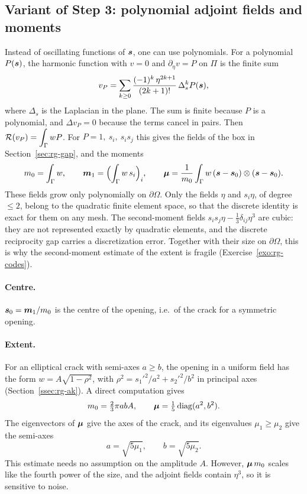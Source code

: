 \subsection{Variant of Step 3: polynomial adjoint fields and moments}\label{ssec:rg-poly}
%
Instead of oscillating functions of $\bm{s}$, one can use polynomials. For a polynomial $P(\bm{s})$, the harmonic function with $v=0$ and $\partial_\eta v=P$ on $\Pi$ is the finite sum
\begin{equation}\label{eq:rg-ck}
v_P=\sum_{k\ge0}\frac{(-1)^k\,\eta^{2k+1}}{(2k+1)!}\,\Delta_s^kP(\bm{s}),
\end{equation}
where $\Delta_s$ is the Laplacian in the plane. The sum is finite because $P$ is a polynomial, and $\Delta v_P=0$ because the terms cancel in pairs. Then $\displaystyle \mathcal{R}(v_P)=\int_\Gamma wP$. For $P=1,\ s_i,\ s_is_j$ this gives the fields of the box in Section~\ref{sec:rg-gap}, and the moments
\[
m_0=\int_\Gamma w,\qquad \bm{m}_1=\Bigl(\int_\Gamma w\,s_i\Bigr)_i,\qquad
\bm{\mu}=\frac1{m_0}\int_\Gamma w\,(\bm{s}-\bm{s}_0)\otimes(\bm{s}-\bm{s}_0).
\]
These fields grow only polynomially on $\partial\Omega$. Only the fields $\eta$ and $s_i\eta$, of degree $\le2$, belong to the quadratic finite element space, so that the discrete identity is exact for them on any mesh. The second-moment fields $s_is_j\eta-\tfrac13\delta_{ij}\eta^3$ are cubic: they are not represented exactly by quadratic elements, and the discrete reciprocity gap carries a discretization error. Together with their size on $\partial\Omega$, this is why the second-moment estimate of the extent is fragile (Exercise~\ref{exo:rg-codes}).

\paragraph{Centre.} $\bm{s}_0=\bm{m}_1/m_0$ is the centre of the opening, i.e.\ of the crack for a symmetric opening.

\paragraph{Extent.} For an elliptical crack with semi-axes $a\ge b$, the opening in a uniform field has the form $w=A\sqrt{1-\rho^2}$, with $\rho^2=s_1'^2/a^2+s_2'^2/b^2$ in principal axes (Section~\ref{ssec:rg-ak}). A direct computation gives
\[
m_0=\tfrac23\pi abA,\qquad \bm{\mu}=\tfrac15\,\mathrm{diag}(a^2,b^2).
\]
The eigenvectors of $\bm{\mu}$ give the axes of the crack, and its eigenvalues $\mu_1\ge\mu_2$ give the semi-axes
\begin{equation}\label{eq:rg-amom}
a=\sqrt{5\mu_1},\qquad b=\sqrt{5\mu_2}.
\end{equation}
This estimate needs no assumption on the amplitude $A$. However, $\bm{\mu}\,m_0$ scales like the fourth power of the size, and the adjoint fields contain $\eta^3$, so it is sensitive to noise.

